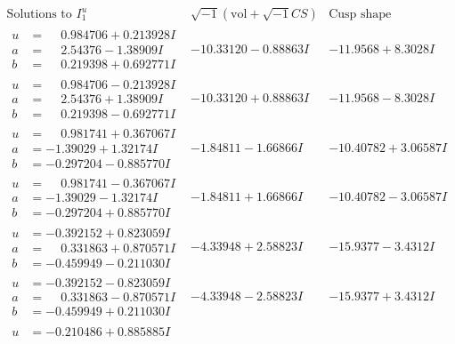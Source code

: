 \documentclass[1p]{elsarticle_modified}
\theoremstyle{definition}
\newcommand{\I}{\sqrt{-1}}
\begin{document}
$$\begin{array}{c|c|c}  
\text{Solutions to }I^u_{1}& \I (\text{vol} + \sqrt{-1}CS) & \text{Cusp shape}\\
 \hline 
\begin{aligned}
u &= \phantom{-}0.984706 + 0.213928 I \\
a &= \phantom{-}2.54376 - 1.38909 I \\
b &= \phantom{-}0.219398 + 0.692771 I\end{aligned}
 & -10.33120 - 0.88863 I & -11.9568 + 8.3028 I \\ \hline\begin{aligned}
u &= \phantom{-}0.984706 - 0.213928 I \\
a &= \phantom{-}2.54376 + 1.38909 I \\
b &= \phantom{-}0.219398 - 0.692771 I\end{aligned}
 & -10.33120 + 0.88863 I & -11.9568 - 8.3028 I \\ \hline\begin{aligned}
u &= \phantom{-}0.981741 + 0.367067 I \\
a &= -1.39029 + 1.32174 I \\
b &= -0.297204 - 0.885770 I\end{aligned}
 & -1.84811 - 1.66866 I & -10.40782 + 3.06587 I \\ \hline\begin{aligned}
u &= \phantom{-}0.981741 - 0.367067 I \\
a &= -1.39029 - 1.32174 I \\
b &= -0.297204 + 0.885770 I\end{aligned}
 & -1.84811 + 1.66866 I & -10.40782 - 3.06587 I \\ \hline\begin{aligned}
u &= -0.392152 + 0.823059 I \\
a &= \phantom{-}0.331863 + 0.870571 I \\
b &= -0.459949 - 0.211030 I\end{aligned}
 & -4.33948 + 2.58823 I & -15.9377 - 3.4312 I \\ \hline\begin{aligned}
u &= -0.392152 - 0.823059 I \\
a &= \phantom{-}0.331863 - 0.870571 I \\
b &= -0.459949 + 0.211030 I\end{aligned}
 & -4.33948 - 2.58823 I & -15.9377 + 3.4312 I \\ \hline\begin{aligned}
u &= -0.210486 + 0.885885 I \\

\end{aligned}
\end{array}$$
\end{document}
